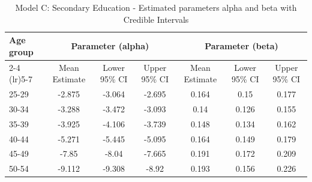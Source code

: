 \begin{landscape}
\begin{table}[htbp]
\centering
\caption{Model C: Secondary Education - Estimated parameters alpha and beta  with Credible Intervals}
\label{tab:Fparameters_ab11}
\begin{tabular}{@{}lcccccc@{}}
\toprule
Age group & \multicolumn{3}{c}{Parameter (alpha)} & \multicolumn{3}{c}{Parameter (beta)} \\ 
\cmidrule(lr){2-4} \cmidrule(lr){5-7}
          & Mean Estimate & Lower 95\% CI & Upper 95\% CI & Mean Estimate & Lower 95\% CI & Upper 95\% CI \\ 
\midrule
25-29 & -2.875 & -3.064 & -2.695 & 0.164 & 0.15 & 0.177 \\
30-34 & -3.288 & -3.472 & -3.093 & 0.14 & 0.126 & 0.155 \\
35-39 & -3.925 & -4.106 & -3.739 & 0.148 & 0.134 & 0.162 \\
40-44 & -5.271 & -5.445 & -5.095 & 0.164 & 0.149 & 0.179 \\
45-49 & -7.85 & -8.04 & -7.665 & 0.191 & 0.172 & 0.209 \\
50-54 & -9.112 & -9.308 & -8.92 & 0.193 & 0.156 & 0.226 \\
\bottomrule
\end{tabular}
\end{table}
\end{landscape}